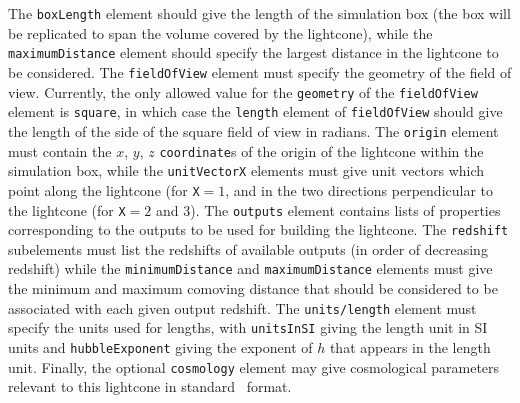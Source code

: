 The {\tt boxLength} element should give the length of the simulation box (the box will be replicated to span the volume covered by the lightcone), while the {\tt maximumDistance} element should specify the largest distance in the lightcone to be considered. The {\tt fieldOfView} element must specify the geometry of the field of view. Currently, the only allowed value for the {\tt geometry} of the {\tt fieldOfView} element is {\tt square}, in which case the {\tt length} element of {\tt fieldOfView} should give the length of the side of the square field of view in radians. The {\tt origin} element must contain the $x$, $y$, $z$ {\tt coordinate}s of the origin of the lightcone within the simulation box, while the {\tt unitVectorX} elements must give unit vectors which point along the lightcone (for {\tt X}$=1$, and in the two directions perpendicular to the lightcone (for {\tt X}$=2$ and 3). The {\tt outputs} element contains lists of properties corresponding to the outputs to be used for building the lightcone. The {\tt redshift} subelements must list the redshifts of available outputs (in order of decreasing redshift) while the {\tt minimumDistance} and {\tt maximumDistance} elements must give the minimum and maximum comoving distance that should be considered to be associated with each given output redshift. The {\tt units/length} element must specify the units used for lengths, with {\tt unitsInSI} giving the length unit in SI units and {\tt hubbleExponent} giving the exponent of $h$ that appears in the length unit. Finally, the optional {\tt cosmology} element may give cosmological parameters relevant to this lightcone in standard \glc\ format.

